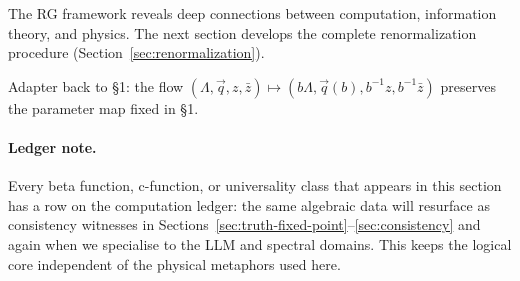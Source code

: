 The RG framework reveals deep connections between computation, information theory, and physics. The next section develops the complete renormalization procedure (Section~\ref{sec:renormalization}).

Adapter back to §1: the flow $(\Lambda,\vec{q},z,\bar{z})\mapsto (b\Lambda,\vec{q}(b),b^{-1}z,b^{-1}\bar{z})$ preserves the parameter map fixed in §1.

\paragraph{Ledger note.} Every beta function, c-function, or universality class that appears in this section has a row on the computation ledger: the same algebraic data will resurface as consistency witnesses in Sections~\ref{sec:truth-fixed-point}--\ref{sec:consistency} and again when we specialise to the LLM and spectral domains. This keeps the logical core independent of the physical metaphors used here.
